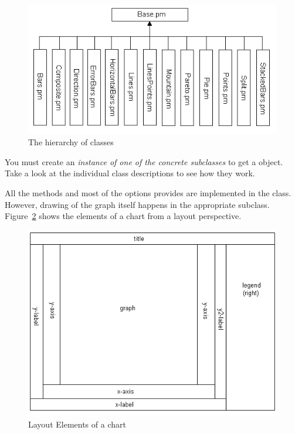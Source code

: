 \begin{figure}[ht]
  \begin{center}
    \includegraphics[scale=0.5]{Aufbau.png}
  \end{center}
  \caption{The hierarchy of  classes}
  \label{fig:Aufbau}
\end{figure}

You must create an \emph{instance of one of the concrete subclasses} to
get a  object. Take a look at the individual class
descriptions to see how they work.

All the methods and most of the options  provides are
implemented in the  class. However, drawing of the
graph itself happens in the appropriate subclass.
Figure~\ref{fig:Elemente} shows the elements of a chart from a layout
perspective.

\begin{figure}[ht]
  \begin{center}
    \includegraphics[scale=0.4]{Elemente.png}
  \end{center}
  \caption{Layout Elements of a chart}
  \label{fig:Elemente}
\end{figure}

